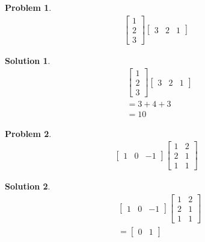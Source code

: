 \documentclass{article}
\newtheorem{problem}{Problem}
\newtheorem*{solution}{Solution}
\begin{document}
\begin{problem}
\begin{align*}
\begin{bmatrix}
1 \\ 2 \\ 3 
\end{bmatrix} 
\begin{bmatrix}
3 & 2 & 1
\end{bmatrix}
\end{align*}
\end{problem}

\begin{solution}
\begin{align*}
& \begin{bmatrix}
1 \\ 2 \\ 3 
\end{bmatrix} 
\begin{bmatrix}
3 & 2 & 1
\end{bmatrix} \\
&= 3 + 4 + 3 \\
&= 10
\end{align*}
\end{solution}

\begin{problem}
\begin{align*}
\begin{bmatrix}
1 & 0 & -1 
\end{bmatrix} 
\begin{bmatrix}
1 & 2 \\ 2 & 1 \\ 1 & 1
\end{bmatrix}
\end{align*}
\end{problem}

\begin{solution}
\begin{align*}
& \begin{bmatrix}
1 & 0 & -1 
\end{bmatrix} 
\begin{bmatrix}
1 & 2 \\ 2 & 1 \\ 1 & 1
\end{bmatrix} \\
&=
\begin{bmatrix}
0 & 1 
\end{bmatrix}
\end{align*}
\end{solution}
\end{document}
